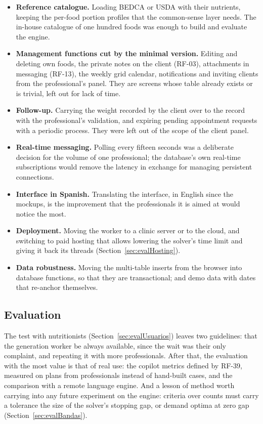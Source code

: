 \begin{itemize}
    \item \textbf{Reference catalogue.} Loading BEDCA or USDA with their nutrients, keeping the per-food portion profiles that the common-sense layer needs. The in-house catalogue of one hundred foods was enough to build and evaluate the engine.
    \item \textbf{Management functions cut by the minimal version.} Editing and deleting own foods, the private notes on the client (RF-03), attachments in messaging (RF-13), the weekly grid calendar, notifications and inviting clients from the professional's panel. They are screens whose table already exists or is trivial, left out for lack of time.
    \item \textbf{Follow-up.} Carrying the weight recorded by the client over to the record with the professional's validation, and expiring pending appointment requests with a periodic process. They were left out of the scope of the client panel.
    \item \textbf{Real-time messaging.} Polling every fifteen seconds was a deliberate decision for the volume of one professional; the database's own real-time subscriptions would remove the latency in exchange for managing persistent connections.
    \item \textbf{Interface in Spanish.} Translating the interface, in English since the mockups, is the improvement that the professionals it is aimed at would notice the most.
    \item \textbf{Deployment.} Moving the worker to a clinic server or to the cloud, and switching to paid hosting that allows lowering the solver's time limit and giving it back its threads (Section~\ref{sec:evalHosting}).
    \item \textbf{Data robustness.} Moving the multi-table inserts from the browser into database functions, so that they are transactional; and demo data with dates that re-anchor themselves.
\end{itemize}

\subsection*{Evaluation}
\label{sec:futureEvaluation}

The test with nutritionists (Section~\ref{sec:evalUsuarios}) leaves two guidelines: that the generation worker be always available, since the wait was their only complaint, and repeating it with more professionals. After that, the evaluation with the most value is that of real use: the copilot metrics defined by RF-39, measured on plans from professionals instead of hand-built cases, and the comparison with a remote language engine. And a lesson of method worth carrying into any future experiment on the engine: criteria over counts must carry a tolerance the size of the solver's stopping gap, or demand optima at zero gap (Section~\ref{sec:evalBandas}).

